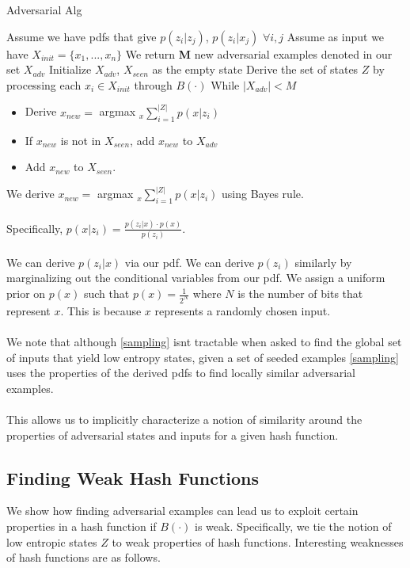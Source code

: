 \documentclass[letterpaper,twocolumn,10pt]{article}
\begin{document}
\begin{algorithm} \label{alg:adv}
\caption{Adversarial Alg}\label{sampling}
\begin{algorithmic}[1]
\State Assume we have pdfs that give $p(z_{i} | z_{j})$, $p(z_{i} | x_{j})$ $\forall i,j$
\State Assume as input we have $X_{init} = \{x_{1}, ..., x_{n}\}$
\State We return \textbf{M} new adversarial examples denoted in our set $X_{adv}$
\State Initialize $X_{adv}$, $X_{seen}$ as the empty state
\State Derive the set of states $Z$ by processing each $x_{i} \in X_{init}$ through $B(\cdot)$
\State While $|X_{adv} | < M$
\begin{itemize}
\item Derive $x_{new} =$ argmax $_{x} \sum_{i=1}^{|Z|} p(x | z_{i})$
\item If $x_{new}$ is not in $X_{seen}$, add $x_{new}$ to $X_{adv}$
\item Add $x_{new}$ to $X_{seen}$.
\end{itemize}
\end{algorithmic}
\end{algorithm}

We derive $x_{new} =$ argmax $_{x} \sum_{i=1}^{|Z|} p(x | z_{i})$ using Bayes rule. 
\\
\\
Specifically, $p(x | z_{i}) = \frac{p(z_{i} | x) \cdot p(x)}{p(z_{i})}$. 
\\
\\
We can derive $p(z_{i} | x)$ via our pdf. We can derive $p(z_{i})$ similarly by marginalizing out the conditional variables from our pdf. We assign a uniform prior on $p(x)$ such that $p(x) = \frac{1}{2^{N}}$ where $N$ is the number of bits that represent $x$. This is because $x$ represents a randomly chosen input.
\\
\\
We note that although \ref{sampling} isnt tractable when asked to find the global set of inputs that yield low entropy states, given a set of seeded examples \ref{sampling} uses the properties of the derived pdfs to find locally similar adversarial examples. 
\\
\\
This allows us to implicitly characterize a notion of similarity around the properties of adversarial states and inputs for a given hash function. 


\subsection{Finding Weak Hash Functions}
We show how finding adversarial examples can lead us to exploit certain properties in a hash function if $B(\cdot)$ is weak. Specifically, we tie the notion of low entropic states $Z$ to weak properties of hash functions. Interesting weaknesses of hash functions are as follows.
\end{document}
